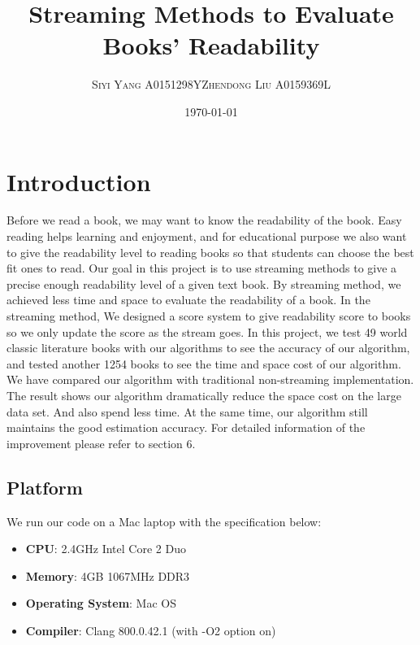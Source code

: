\documentclass{article}
\title{Streaming Methods to Evaluate Books' Readability} %
\author{\textsc{Siyi Yang} A0151298Y\quad \textsc{Zhendong Liu} A0159369L} %
\date{\today} %
\begin{document}
\maketitle %
\section{Introduction}
Before we read a book, we may want to know the readability of the book. Easy reading helps learning and enjoyment\cite{fry}, and for educational purpose we also want to give the readability level to reading books so that students can choose the best fit ones to read. 
\newline
\newline
Our goal in this project is to use streaming methods to give a precise enough readability level of a given text book. By streaming method, we achieved less time and space to evaluate the readability of a book. In the streaming method, We designed a score system to give readability score to books so we only update the score as the stream goes. In this project, we test 49 world classic literature books with our algorithms to see the accuracy of our algorithm, and tested another 1254 books to see the time and space cost of our algorithm.
\newline
\newline
We have compared our algorithm with traditional non-streaming implementation. The result shows our algorithm dramatically reduce the space cost on the large data set. And also spend less time. At the same time, our algorithm still maintains the good estimation accuracy. For detailed information of the improvement please refer to section 6.
\subsection{Platform}
We run our code on a Mac laptop with the specification below:
\begin{itemize}
\item \textbf{CPU}: 2.4GHz Intel Core 2 Duo
\item \textbf{Memory}: 4GB 1067MHz DDR3
\item \textbf{Operating System}: Mac OS
\item \textbf{Compiler}: Clang 800.0.42.1 (with -O2 option on)
\end{itemize}
\end{document}
